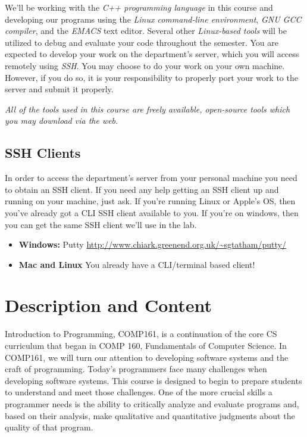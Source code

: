 \documentclass[10pt]{article}
\begin{document}
We'll be working with the \textit{C++ programming language} in this course and developing our programs using the \textit{Linux command-line environment}, \textit{GNU GCC compiler}, and the \textit{EMACS} text editor.  Several other \textit{Linux-based tools} will be utilized to debug and evaluate your code throughout the semester. You are expected to develop your work on the department's server, which you will access remotely using \textit{SSH}.  You may choose to do your work on your own machine. However, if you do so, it is your responsibility to properly port your work to the server and submit it properly.  

\textit{All of the tools used in this course are freely available, open-source tools which you may download via the web.}


\subsection{SSH Clients}

In order to access the department's server from your personal machine you need to obtain an SSH client. If you need any help getting an SSH client up and running on your machine, just ask.  If you're running Linux or Apple's OS, then you've already got a CLI SSH client available to you.  If you're on windows, then you can get the same SSH client we'll use in the lab. 
\begin{itemize}
\item \textbf{Windows:} Putty \url{http://www.chiark.greenend.org.uk/~sgtatham/putty/}
\item \textbf{Mac and Linux} You already have a CLI/terminal based client!  
\end{itemize}

\section{Description and Content}

Introduction to Programming, COMP161, is a continuation of the core CS curriculum that began in COMP 160, Fundamentals of Computer Science.  In COMP161, we will turn our attention to developing software systems and the craft of programming.  Today's programmers face many challenges when developing software systems. This course is designed to begin to prepare students to understand and meet those challenges.  One of the more crucial skills a programmer needs is the ability to critically analyze and evaluate programs and, based on their analysis, make qualitative and quantitative judgments about the quality of that program.  
\end{document}
